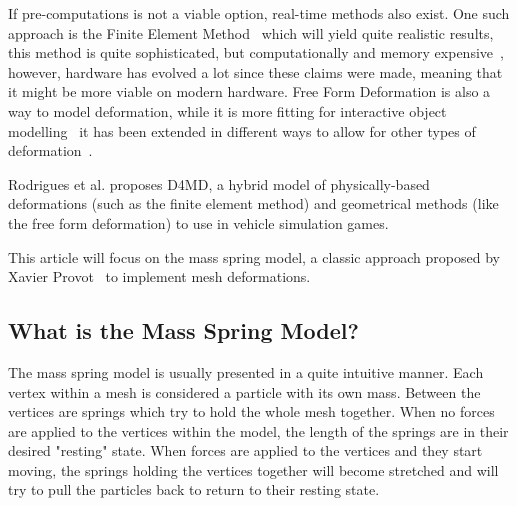 If pre-computations is not a viable option, real-time methods also exist.
One such approach is the Finite Element Method~\cite{muller_fem} which will yield quite realistic results, this method is quite sophisticated, but computationally and memory expensive~\cite{rodrigues2005d4md}, however, hardware has evolved a lot since these claims were made, meaning that it might be more viable on modern hardware.
Free Form Deformation is also a way to model deformation, while it is more fitting for interactive object modelling~\cite{rodrigues2005d4md} it has been extended in different ways to allow for other types of deformation~\cite{coquillart_eefd}.

Rodrigues et al.\cite{rodrigues2005d4md} proposes D4MD, a hybrid model of physically-based deformations (such as the finite element method) and geometrical methods (like the free form deformation) to use in vehicle simulation games.

This article will focus on the mass spring model, a classic approach proposed by Xavier Provot~\cite{provot_mass_spring} to implement mesh deformations. 

\subsection{What is the Mass Spring Model?}
The mass spring model is usually presented in a quite intuitive manner.
Each vertex within a mesh is considered a particle with its own mass.
Between the vertices are springs which try to hold the whole mesh together.
When no forces are applied to the vertices within the model, the length of the springs are in their desired "resting" state.
When forces are applied to the vertices and they start moving, the springs holding the vertices together will become stretched
and will try to pull the particles back to return to their resting state\cite{catlike_mesh_deformation, mosegaards_clothing_simulation, provot_mass_spring}.





